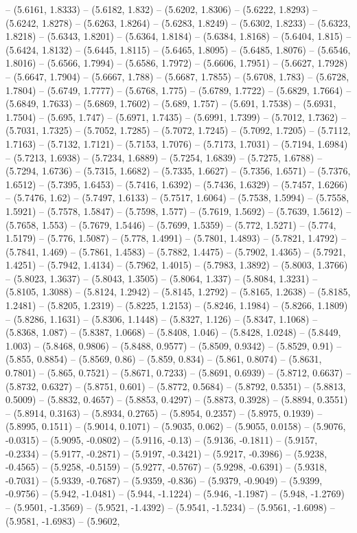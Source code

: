-- (5.6161, 1.8333) -- (5.6182, 1.832) -- (5.6202, 1.8306) -- (5.6222, 1.8293) -- (5.6242, 1.8278) -- (5.6263, 1.8264) -- (5.6283, 1.8249) -- (5.6302, 1.8233) -- (5.6323, 1.8218) -- (5.6343, 1.8201) -- (5.6364, 1.8184) -- (5.6384, 1.8168) -- (5.6404, 1.815) -- (5.6424, 1.8132) -- (5.6445, 1.8115) -- (5.6465, 1.8095) -- (5.6485, 1.8076) -- (5.6546, 1.8016) -- (5.6566, 1.7994) -- (5.6586, 1.7972) -- (5.6606, 1.7951) -- (5.6627, 1.7928) -- (5.6647, 1.7904) -- (5.6667, 1.788) -- (5.6687, 1.7855) -- (5.6708, 1.783) -- (5.6728, 1.7804) -- (5.6749, 1.7777) -- (5.6768, 1.775) -- (5.6789, 1.7722) -- (5.6829, 1.7664) -- (5.6849, 1.7633) -- (5.6869, 1.7602) -- (5.689, 1.757) -- (5.691, 1.7538) -- (5.6931, 1.7504) -- (5.695, 1.747) -- (5.6971, 1.7435) -- (5.6991, 1.7399) -- (5.7012, 1.7362) -- (5.7031, 1.7325) -- (5.7052, 1.7285) -- (5.7072, 1.7245) -- (5.7092, 1.7205) -- (5.7112, 1.7163) -- (5.7132, 1.7121) -- (5.7153, 1.7076) -- (5.7173, 1.7031) -- (5.7194, 1.6984) -- (5.7213, 1.6938) -- (5.7234, 1.6889) -- (5.7254, 1.6839) -- (5.7275, 1.6788) -- (5.7294, 1.6736) -- (5.7315, 1.6682) -- (5.7335, 1.6627) -- (5.7356, 1.6571) -- (5.7376, 1.6512) -- (5.7395, 1.6453) -- (5.7416, 1.6392) -- (5.7436, 1.6329) -- (5.7457, 1.6266) -- (5.7476, 1.62) -- (5.7497, 1.6133) -- (5.7517, 1.6064) -- (5.7538, 1.5994) -- (5.7558, 1.5921) -- (5.7578, 1.5847) -- (5.7598, 1.577) -- (5.7619, 1.5692) -- (5.7639, 1.5612) -- (5.7658, 1.553) -- (5.7679, 1.5446) -- (5.7699, 1.5359) -- (5.772, 1.5271) -- (5.774, 1.5179) -- (5.776, 1.5087) -- (5.778, 1.4991) -- (5.7801, 1.4893) -- (5.7821, 1.4792) -- (5.7841, 1.469) -- (5.7861, 1.4583) -- (5.7882, 1.4475) -- (5.7902, 1.4365) -- (5.7921, 1.4251) -- (5.7942, 1.4134) -- (5.7962, 1.4015) -- (5.7983, 1.3892) -- (5.8003, 1.3766) -- (5.8023, 1.3637) -- (5.8043, 1.3505) -- (5.8064, 1.337) -- (5.8084, 1.3231) -- (5.8105, 1.3088) -- (5.8124, 1.2942) -- (5.8145, 1.2792) -- (5.8165, 1.2638) -- (5.8185, 1.2481) -- (5.8205, 1.2319) -- (5.8225, 1.2153) -- (5.8246, 1.1984) -- (5.8266, 1.1809) -- (5.8286, 1.1631) -- (5.8306, 1.1448) -- (5.8327, 1.126) -- (5.8347, 1.1068) -- (5.8368, 1.087) -- (5.8387, 1.0668) -- (5.8408, 1.046) -- (5.8428, 1.0248) -- (5.8449, 1.003) -- (5.8468, 0.9806) -- (5.8488, 0.9577) -- (5.8509, 0.9342) -- (5.8529, 0.91) -- (5.855, 0.8854) -- (5.8569, 0.86) -- (5.859, 0.834) -- (5.861, 0.8074) -- (5.8631, 0.7801) -- (5.865, 0.7521) -- (5.8671, 0.7233) -- (5.8691, 0.6939) -- (5.8712, 0.6637) -- (5.8732, 0.6327) -- (5.8751, 0.601) -- (5.8772, 0.5684) -- (5.8792, 0.5351) -- (5.8813, 0.5009) -- (5.8832, 0.4657) -- (5.8853, 0.4297) -- (5.8873, 0.3928) -- (5.8894, 0.3551) -- (5.8914, 0.3163) -- (5.8934, 0.2765) -- (5.8954, 0.2357) -- (5.8975, 0.1939) -- (5.8995, 0.1511) -- (5.9014, 0.1071) -- (5.9035, 0.062) -- (5.9055, 0.0158) -- (5.9076, -0.0315) -- (5.9095, -0.0802) -- (5.9116, -0.13) -- (5.9136, -0.1811) -- (5.9157, -0.2334) -- (5.9177, -0.2871) -- (5.9197, -0.3421) -- (5.9217, -0.3986) -- (5.9238, -0.4565) -- (5.9258, -0.5159) -- (5.9277, -0.5767) -- (5.9298, -0.6391) -- (5.9318, -0.7031) -- (5.9339, -0.7687) -- (5.9359, -0.836) -- (5.9379, -0.9049) -- (5.9399, -0.9756) -- (5.942, -1.0481) -- (5.944, -1.1224) -- (5.946, -1.1987) -- (5.948, -1.2769) -- (5.9501, -1.3569) -- (5.9521, -1.4392) -- (5.9541, -1.5234) -- (5.9561, -1.6098) -- (5.9581, -1.6983) -- (5.9602, 